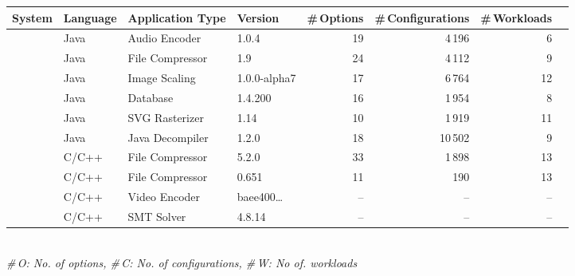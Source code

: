 \begin{tabular}{p{1.5cm}lp{2.5cm}lrrrr}
		\toprule
		\textbf{System} & \textbf{Language} & \textbf{Application Type} & \textbf{Version} & \textbf{\#\,Options} & \textbf{\#\,Configurations} & \textbf{\#\,Workloads}  \\
		\midrule
		\jumper & Java & Audio Encoder & 1.0.4 & 19 & 4\,196 & 6   \\
		
		\kanzi &Java  & File Compressor & 1.9 & 24 & 4\,112 & 9 \\
			
		\dconvert & Java & Image Scaling & 1.0.0-alpha7 & 17 & 6\,764 & 12  \\
				
		\htwo & Java & Database & 1.4.200 & 16 & 1\,954  & 8  \\
		
		\batik & Java & SVG Rasterizer & 1.14 & 10 & 1\,919 &  11  \\
		
		\jadx & Java & Java Decompiler & 1.2.0 & 18 & 10\,502 & 9  \\
		
		
		 \xz & C/C++ & File Compressor & 5.2.0 & 33 & 1\,898 & 13  \\
		\lrzip & C/C++ & File Compressor & 0.651 & 11 & 190 & 13  \\
		\midrule
		\rowcolor{green!70!black}\xzwo & C/C++ & Video Encoder & baee400\ldots & -- & -- & --  \\
		\rowcolor{green!70!black}\zdrei & C/C++ & SMT Solver & 4.8.14 & -- & -- & --  \\
\bottomrule

\end{tabular}\\
{\centering\vspace{1mm}\textit{\#\,O: No. of options, \#\,C: No. of configurations, \#\,W: No of. workloads}}
